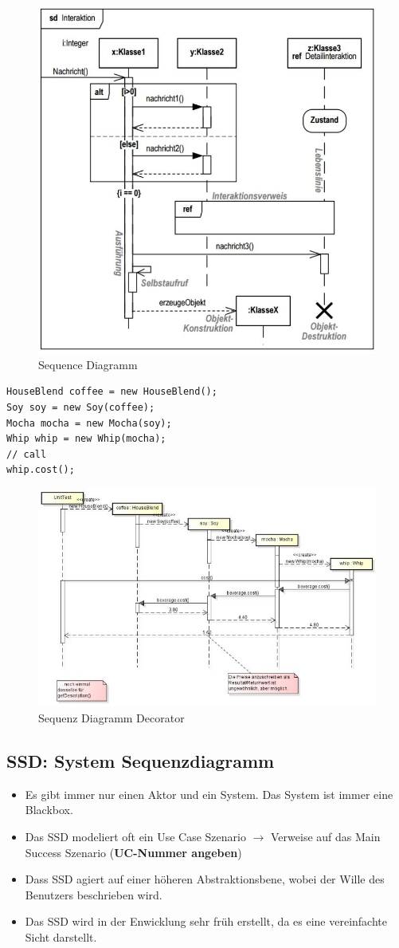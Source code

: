 \begin{figure}[h!]
\centering
\includegraphics[width=0.55\linewidth]{images/sequencediagram}
\caption{Sequence Diagramm}
\label{fig:sequencediagram}
\end{figure}

\begin{lstlisting}
HouseBlend coffee = new HouseBlend();
Soy soy = new Soy(coffee);
Mocha mocha = new Mocha(soy);
Whip whip = new Whip(mocha);
// call
whip.cost();
\end{lstlisting}

\begin{figure}[h!]
	\centering
	\includegraphics[width=0.9\linewidth]{images/sequence_decorator}
	\caption{Sequenz Diagramm Decorator}
	\label{fig:sequencedecorator}
\end{figure}


\clearpage

\subsection{SSD: System Sequenzdiagramm}
\begin{itemize}
	\item Es gibt immer nur einen Aktor und ein System. Das System ist immer eine Blackbox.
	\item Das SSD modeliert oft ein Use Case Szenario $\rightarrow$ Verweise auf das Main Success Szenario (\textbf{UC-Nummer angeben})
	\item Dass SSD agiert auf einer höheren Abstraktionsbene, wobei der Wille des Benutzers beschrieben wird.

	\item Das SSD wird in der Enwicklung sehr früh erstellt, da es eine vereinfachte Sicht darstellt.
\end{itemize}

